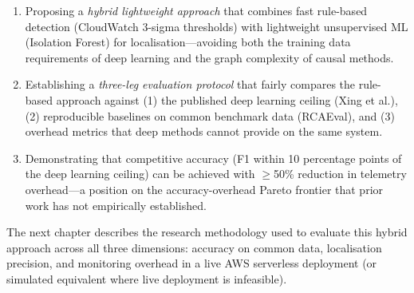 \begin{enumerate}
    \item Proposing a \textit{hybrid lightweight approach} that combines fast rule-based detection (CloudWatch 3-sigma thresholds) with lightweight unsupervised ML (Isolation Forest) for localisation—avoiding both the training data requirements of deep learning and the graph complexity of causal methods.
    
    \item Establishing a \textit{three-leg evaluation protocol} that fairly compares the rule-based approach against (1) the published deep learning ceiling (Xing et al.), (2) reproducible baselines on common benchmark data (RCAEval), and (3) overhead metrics that deep methods cannot provide on the same system.
    
    \item Demonstrating that competitive accuracy (F1 within 10 percentage points of the deep learning ceiling) can be achieved with $\geq$50\% reduction in telemetry overhead—a position on the accuracy-overhead Pareto frontier that prior work has not empirically established.
\end{enumerate}

The next chapter describes the research methodology used to evaluate this hybrid approach across all three dimensions: accuracy on common data, localisation precision, and monitoring overhead in a live AWS serverless deployment (or simulated equivalent where live deployment is infeasible).
